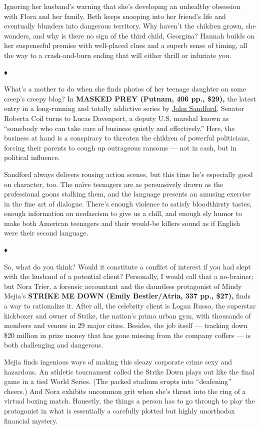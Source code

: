 Ignoring her husband's warning that she's developing an unhealthy
obsession with Flora and her family, Beth keeps snooping into her
friend's life and eventually blunders into dangerous territory. Why
haven't the children grown, she wonders, and why is there no sign of the
third child, Georgina? Hannah builds on her suspenseful premise with
well-placed clues and a superb sense of timing, all the way to a
crash-and-burn ending that will either thrill or infuriate you.

♦

What's a mother to do when she finds photos of her teenage daughter on
some creep's creepy blog? In \textbf{MASKED PREY (Putnam, 406 pp.,
\$29),} the latest entry in a long-running and totally addictive series
by
\href{https://www.nytimes3xbfgragh.onion/2018/11/15/books/review/john-sandford-by-the-book.html}{John
Sandford}, Senator Roberta Coil turns to Lucas Davenport, a deputy U.S.
marshal known as ``somebody who can take care of business quietly and
effectively.'' Here, the business at hand is a conspiracy to threaten
the children of powerful politicians, forcing their parents to cough up
outrageous ransoms --- not in cash, but in political influence.

Sandford always delivers rousing action scenes, but this time he's
especially good on character, too. The naïve teenagers are as
persuasively drawn as the professional goons stalking them, and the
language presents an amusing exercise in the fine art of dialogue.
There's enough violence to satisfy bloodthirsty tastes, enough
information on neofascism to give us a chill, and enough sly humor to
make both American teenagers and their would-be killers sound as if
English were their second language.

♦

So, what do you think? Would it constitute a conflict of interest if you
had slept with the husband of a potential client? Personally, I would
call that a no-brainer; but Nora Trier, a forensic accountant and the
dauntless protagonist of Mindy Mejia's \textbf{STRIKE ME DOWN (Emily
Bestler/Atria, 337 pp., \$27),} finds a way to rationalize it. After
all, the celebrity client is Logan Russo, the superstar kickboxer and
owner of Strike, the nation's primo urban gym, with thousands of members
and venues in 29 major cities. Besides, the job itself --- tracking down
\$20 million in prize money that has gone missing from the company
coffers --- is both challenging and dangerous.

Mejia finds ingenious ways of making this sleazy corporate crime sexy
and hazardous. An athletic tournament called the Strike Down plays out
like the final game in a tied World Series. (The packed stadium erupts
into ``deafening'' cheers.) And Nora exhibits uncommon grit when she's
thrust into the ring of a virtual boxing match. Honestly, the things a
person has to go through to play the protagonist in what is essentially
a carefully plotted but highly unorthodox financial mystery.

